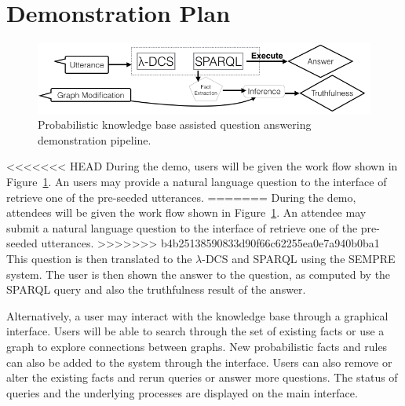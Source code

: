 
\section{Demonstration Plan}

\begin{figure}
\centering
 \includegraphics[width=0.9\linewidth]{images/probqa-pipeline.png}
 \caption{Probabilistic knowledge base assisted question answering demonstration pipeline.}
\label{fig:probqa-pipeline}
\end{figure}


<<<<<<< HEAD
During the demo, users will be given the work flow shown in Figure~\ref{fig:probqa-pipeline}.
An users may provide a natural language question to the interface of retrieve one of the pre-seeded utterances.
=======
During the demo, attendees will be given the work flow shown in Figure~\ref{fig:probqa-pipeline}.
An attendee may submit a natural language question to the interface of retrieve one of the pre-seeded utterances.
>>>>>>> b4b25138590833d90f66c62255ea0e7a940b0ba1
This question is then translated to the \(\lambda\)-DCS and SPARQL using the SEMPRE system.
The user is then shown the answer to the question, as computed by the SPARQL
query and also the truthfulness result of the answer.

Alternatively, a user may interact with the knowledge base through a graphical interface.
Users will be able to search through the set of existing facts or use a graph to explore connections between graphs.
New probabilistic facts and rules can also be added to the system through the interface.
Users can also remove or alter the existing facts and rerun queries or answer more questions.
The status of queries and the underlying processes are displayed on the main interface.








